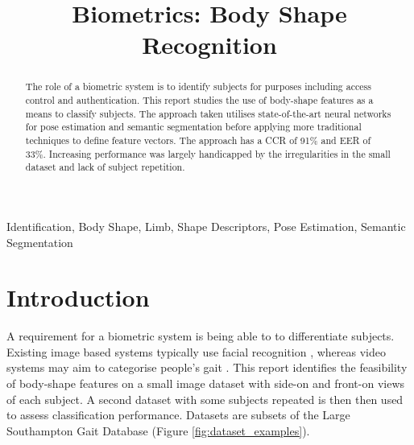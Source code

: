 \documentclass[conference]{IEEEtran}
\begin{document}
\title{Biometrics: Body Shape Recognition\\
}

\author{
}
\maketitle

\begin{abstract}
  The role of a biometric system is to identify subjects for purposes including access control and authentication. This report studies the use of body-shape features as a means to classify subjects. The approach taken utilises state-of-the-art neural networks for pose estimation and semantic segmentation before applying more traditional techniques to define feature vectors. The approach has a CCR of 91\% and EER of 33\%. Increasing performance was largely handicapped by the irregularities in the small dataset and lack of subject repetition.
\end{abstract}

\begin{IEEEkeywords}
Identification, Body Shape, Limb, Shape Descriptors, Pose Estimation, Semantic Segmentation
\end{IEEEkeywords}

\section{Introduction}
\noindent A requirement for a biometric system is being able to to differentiate subjects. Existing image based systems typically use facial recognition \cite{biometric_systems}, whereas video systems may aim to categorise people's gait \cite{Nixon_Tan_Chellappa_2006}. This report identifies the feasibility of body-shape features on a small image dataset with side-on and front-on views of each subject. A second dataset with some subjects repeated is then then used to assess classification performance. Datasets are subsets of the Large Southampton Gait Database \cite{shutler:gait_database} (Figure \ref{fig:dataset_examples}).
\end{document}

